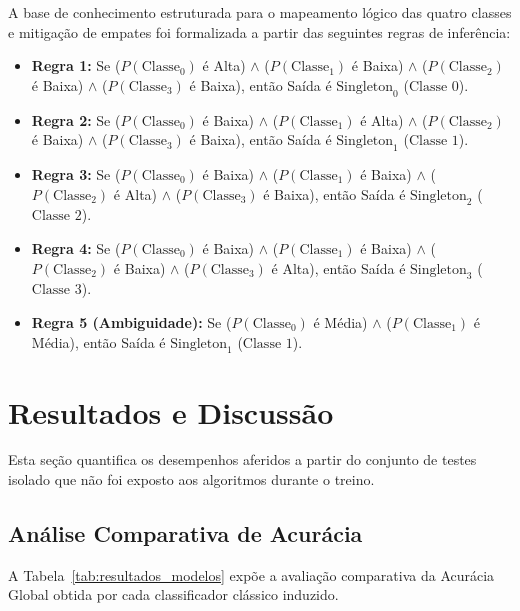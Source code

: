 \documentclass[journal]{IEEEtran}
\begin{document}
A base de conhecimento estruturada para o mapeamento lógico das quatro classes e mitigação de empates foi formalizada a partir das seguintes regras de inferência:
\begin{itemize}
    \item \textbf{Regra 1:} Se ($P(\text{Classe}_0)$ é Alta) $\wedge$ ($P(\text{Classe}_1)$ é Baixa) $\wedge$ ($P(\text{Classe}_2)$ é Baixa) $\wedge$ ($P(\text{Classe}_3)$ é Baixa), então Saída é $\text{Singleton}_0$ ($\text{Classe 0}$).
    \item \textbf{Regra 2:} Se ($P(\text{Classe}_0)$ é Baixa) $\wedge$ ($P(\text{Classe}_1)$ é Alta) $\wedge$ ($P(\text{Classe}_2)$ é Baixa) $\wedge$ ($P(\text{Classe}_3)$ é Baixa), então Saída é $\text{Singleton}_1$ ($\text{Classe 1}$).
    \item \textbf{Regra 3:} Se ($P(\text{Classe}_0)$ é Baixa) $\wedge$ ($P(\text{Classe}_1)$ é Baixa) $\wedge$ ($P(\text{Classe}_2)$ é Alta) $\wedge$ ($P(\text{Classe}_3)$ é Baixa), então Saída é $\text{Singleton}_2$ ($\text{Classe 2}$).
    \item \textbf{Regra 4:} Se ($P(\text{Classe}_0)$ é Baixa) $\wedge$ ($P(\text{Classe}_1)$ é Baixa) $\wedge$ ($P(\text{Classe}_2)$ é Baixa) $\wedge$ ($P(\text{Classe}_3)$ é Alta), então Saída é $\text{Singleton}_3$ ($\text{Classe 3}$).
    \item \textbf{Regra 5 (Ambiguidade):} Se ($P(\text{Classe}_0)$ é Média) $\wedge$ ($P(\text{Classe}_1)$ é Média), então Saída é $\text{Singleton}_1$ ($\text{Classe 1}$).
\end{itemize}

\section{Resultados e Discussão}
Esta seção quantifica os desempenhos aferidos a partir do conjunto de testes isolado que não foi exposto aos algoritmos durante o treino.

\subsection{Análise Comparativa de Acurácia}
A Tabela~\ref{tab:resultados_modelos} expõe a avaliação comparativa da Acurácia Global obtida por cada classificador clássico induzido.
\end{document}
